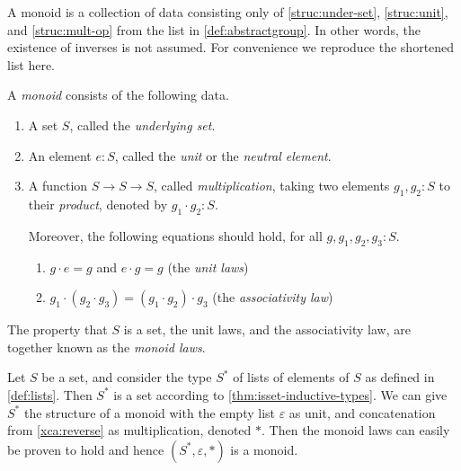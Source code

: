   A monoid is a collection of data consisting only of \ref{struc:under-set}, 
  \ref{struc:unit}, and \ref{struc:mult-op} from the list in
  \cref{def:abstractgroup}.
  In other words, the existence of inverses is not assumed.
  For convenience we reproduce the shortened list here.

\begin{definition}\label{def:monoid}
  A \emph{monoid} consists of the following data.
  \begin{enumerate}
  \item\label{struc:monoid-set} A set $S$, called the \emph{underlying set}.
  \item\label{struc:monoid-unit} An element $e:S$, called the \emph{unit} or the \emph{neutral element}.
  \item\label{struc:monoid-mult} A function $S\to S\to S$, called \emph{multiplication},
    taking two elements $g_1,g_2:S$ to their \emph{product}, denoted by $g_1\cdot g_2:S$.
    \par \noindent
    Moreover, the following equations should hold, for all $g,g_1,g_2,g_3 : S$.
    \begin{enumerate}[label=(\alph*),ref=\ref{struc:monoid-mult} (\alph*)]
    \item\label{monoid:unit-laws} $g\cdot e=g$ and $e\cdot g=g$ (the \emph{unit laws})
    \item\label{monoid:ass-law} $g_1\cdot(g_2\cdot g_3)=(g_1\cdot g_2)\cdot g_3$ 
         (the \emph{associativity law})
    \end{enumerate}
  \end{enumerate}
 The property that $S$ is a set, the
  unit laws, and the associativity law, are together known as the \emph{monoid laws}.
\end{definition}

\begin{example}\label{exa:monoid}
Let $S$ be a set, and consider the type $S^*$ of lists of elements of $S$
as defined in \cref{def:lists}. Then $S^*$ is a set according to
\cref{thm:isset-inductive-types}. We can give $S^*$ the structure
of a monoid with the empty list $\varepsilon$ as unit, and concatenation
from \cref{xca:reverse} as multiplication, denoted $\ast$.
Then the monoid laws can easily be proven to hold and hence
$(S^*,\varepsilon,\ast)$ is a monoid.
\end{example}


